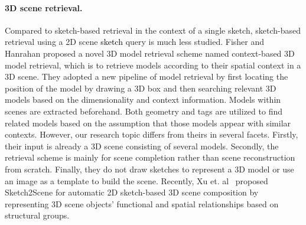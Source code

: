 \documentclass[times, 10pt,twocolumn]{article}
\begin{document}
\paragraph{3D scene retrieval.} Compared to sketch-based retrieval in the context of a single sketch, sketch-based retrieval using a 2D scene \textcolor{black}{sketch} query is much less studied. Fisher and Hanrahan \cite{DBLP:journals/tog/FisherHanrahan10} proposed a novel 3D model retrieval scheme named context-based 3D model retrieval, which is to retrieve models according to their spatial context in a 3D scene. They adopted a new pipeline of model retrieval by first locating the position of the model by drawing a 3D box and then searching relevant 3D models based on the dimensionality and context information. Models within scenes are extracted beforehand. Both geometry and tags are utilized to find related models based on the assumption that those models appear with similar contexts. However, our research topic differs from theirs in several facets. Firstly, their input is already a 3D scene consisting of several models. Secondly, the retrieval scheme is mainly for scene completion rather than scene reconstruction from scratch. Finally, they do not draw sketches to represent a 3D model or use an image as a template to build the scene. Recently, Xu et. al~\cite{DBLP:journals/tog/XuCFSH13} proposed Sketch2Scene for automatic 2D sketch-based 3D scene composition by representing 3D scene objects' functional and spatial relationships based on structural groups. 





\end{document}
